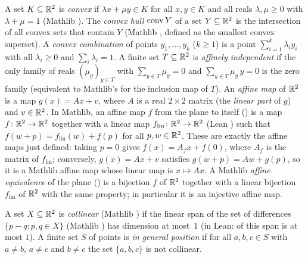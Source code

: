 \begin{definition}\label{fd:def:conv}
A set $K\subseteq\mathbb R^2$ is \emph{convex} if $\lambda x+\mu y\in K$ for all $x,y\in K$ and all reals
$\lambda,\mu\ge0$ with $\lambda+\mu=1$ (Mathlib ). The \emph{convex hull} $\operatorname{conv} Y$ of a set
$Y\subseteq\mathbb R^2$ is the intersection of all convex sets that contain $Y$ (Mathlib ,
defined as the smallest convex superset). A \emph{convex combination} of points $y_1,\dots,y_k$
($k\ge1$) is a point $\sum_{i=1}^k\lambda_iy_i$ with all $\lambda_i\ge0$ and $\sum_i\lambda_i=1$. A finite
set $T\subseteq\mathbb R^2$ is \emph{affinely independent} if the only family of reals $(\mu_y)_{y\in T}$ with
$\sum_{y\in T}\mu_y=0$ and $\sum_{y\in T}\mu_y\,y=0$ is the zero family (equivalent to Mathlib's
 for the inclusion map of $T$). An \emph{affine map} of $\mathbb R^2$ is a map
$g(x)=Ax+v$, where $A$ is a real $2\times2$ matrix (the \emph{linear part} of $g$) and $v\in\mathbb R^2$.
In Mathlib, an affine map $f$ from the plane to itself () is a map $f\colon\mathbb R^2\to\mathbb R^2$
together with a linear map $f_{\mathrm{lin}}\colon\mathbb R^2\to\mathbb R^2$ (Lean ) such that
$f(w+p)=f_{\mathrm{lin}}(w)+f(p)$ for all $p,w\in\mathbb R^2$. These are exactly the affine maps just defined:
taking $p=0$ gives $f(x)=A_fx+f(0)$, where $A_f$ is the matrix of $f_{\mathrm{lin}}$; conversely,
$g(x)=Ax+v$ satisfies $g(w+p)=Aw+g(p)$, so it is a Mathlib affine map whose linear map is $x\mapsto Ax$.
A Mathlib \emph{affine equivalence} of the plane () is a bijection $f$ of $\mathbb R^2$
together with a linear bijection $f_{\mathrm{lin}}$ of $\mathbb R^2$ with the same property; in particular it
is an injective affine map.
\end{definition}

\begin{definition}\label{fd:def:gp}\sloppy
A set $X\subseteq\mathbb R^2$ is \emph{collinear} (Mathlib ) if the linear span of the set of
differences $\{p-q:p,q\in X\}$ (Mathlib ) has dimension at most~$1$ (in Lean:
 of this span is at most $1$). A finite set $S$ of points is \emph{in general
position} if for all $a,b,c\in S$ with $a\ne b$, $a\ne c$ and $b\ne c$ the set $\{a,b,c\}$ is not
collinear.
\end{definition}

